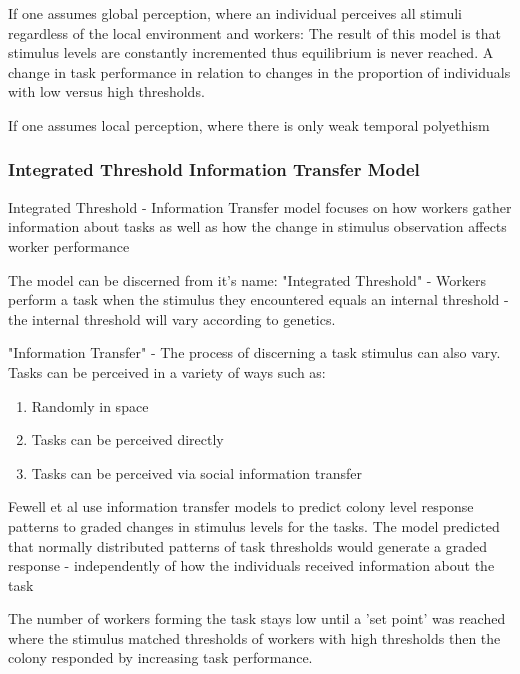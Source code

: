 If one assumes global perception, where an individual perceives all stimuli regardless of the local environment and workers:
The result of this model is that stimulus levels are constantly incremented thus equilibrium is never reached. A change in task performance in relation to changes in the proportion of individuals with low versus high thresholds. %

If one assumes local perception, where there is only weak temporal polyethism





\subsubsection{Integrated Threshold Information Transfer Model}
Integrated Threshold - Information Transfer model \cite{fewell1999division} focuses on how workers gather information about tasks as well as how the change in stimulus observation affects worker performance %

The model can be discerned from it's name:
"Integrated Threshold" - Workers perform a task when the stimulus they encountered equals an internal threshold - the internal threshold will vary according to genetics. 

"Information Transfer" - The process of discerning a task stimulus can also vary.
Tasks can be perceived in a variety of ways such as:

\begin{enumerate}
	\item Randomly in space
	\item Tasks can be perceived directly
	\item Tasks can be perceived via social information transfer
\end{enumerate}

Fewell et al \cite{fewell1999division} use information transfer models to predict colony level response patterns to graded changes in stimulus levels for the tasks. The model predicted that normally distributed patterns of task thresholds would generate a graded response - independently of how the individuals received information about the task

The number of workers forming the task stays low until a 'set point' was reached where the stimulus matched thresholds of workers with high thresholds then the colony responded by increasing task performance.

